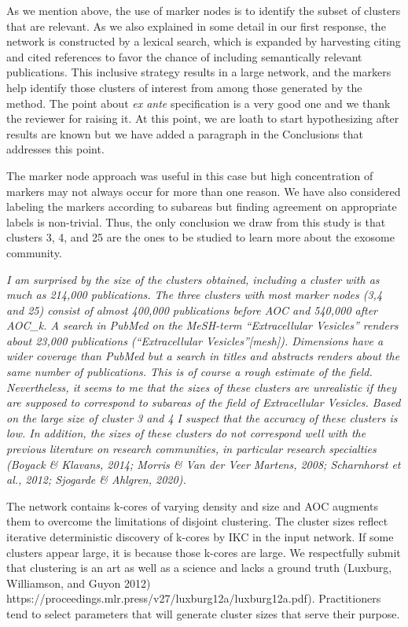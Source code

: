 \documentclass[11pt, oneside]{article}   	%
\begin{document}
\vspace{2 mm}  
As we mention above, the use of marker nodes is to identify the subset of clusters that are relevant. As we also explained in some detail in our first response, the network is constructed by a lexical search, which is expanded by harvesting citing and cited references to favor the chance of including semantically relevant publications. This inclusive strategy results in a large network, and the markers help identify those clusters of interest from among those generated by the method. The point about \emph{ex ante} specification is a very good one and we thank the reviewer for raising it. At this point, we are loath to start hypothesizing after results are known but we have added a paragraph in the Conclusions that addresses this point.

The marker node approach was useful in this case but high concentration of markers may not always occur for more than one reason. We have also considered labeling the markers according to subareas but finding agreement on appropriate labels is non-trivial. Thus, the only conclusion we draw from this study is that clusters 3, 4, and 25 are the ones to be studied to learn more about the exosome community. 

\vspace{2 mm}  
\emph{ I am surprised by the size of the clusters obtained, including a cluster with as much as 214,000 publications. The three clusters with most marker nodes (3,4 and 25) consist of almost 400,000 publications before AOC and 540,000 after AOC\_k. A search in PubMed on the MeSH-term “Extracellular Vesicles” renders about 23,000 publications (“Extracellular Vesicles”[mesh]). Dimensions have a wider coverage than PubMed but a search in titles and abstracts renders about the same number of publications. This is of course a rough estimate of the field. Nevertheless, it seems to me that the sizes of these clusters are unrealistic if they are supposed to correspond to subareas of the field of Extracellular Vesicles. Based on the large size of cluster 3 and 4 I suspect that the accuracy of these clusters is low. In addition, the sizes of these clusters do not correspond well with the previous literature on research communities, in particular research specialties (Boyack \& Klavans, 2014; Morris \& Van der Veer Martens, 2008; Scharnhorst et al., 2012; Sjogarde \& Ahlgren, 2020).}

\vspace{2 mm} 
The network contains k-cores of varying density and size and AOC augments them to overcome the limitations of disjoint clustering. The cluster sizes reflect iterative deterministic discovery of k-cores by IKC in the input network. If some clusters appear large, it is because those k-cores are large. We respectfully submit that clustering is an art as well as a science and lacks a ground truth (Luxburg, Williamson, and Guyon 2012) 
https://proceedings.mlr.press/v27/luxburg12a/luxburg12a.pdf). Practitioners tend to select parameters that will generate cluster sizes that serve their purpose. 
\end{document}
